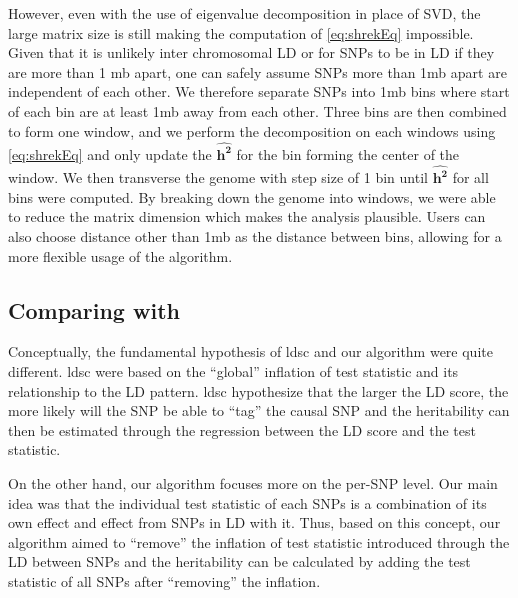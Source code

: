 			However, even with the use of eigenvalue decomposition in place of \gls{SVD}, the large matrix size is still making the computation of \cref{eq:shrekEq} impossible. 
			Given that it is unlikely inter chromosomal \gls{LD} or for \glspl{SNP} to be in \gls{LD} if they are more than 1 \gls{mb} apart, one can safely assume \glspl{SNP} more than 1\gls{mb} apart are independent of each other. 
			We therefore separate \glspl{SNP} into 1\gls{mb} bins where start of each bin are at least 1\gls{mb} away from each other. 
			Three bins are then combined to form one window, and we perform the decomposition on each windows using \cref{eq:shrekEq} and only update the $\boldsymbol{\hat{h^2}}$ for the bin forming the center of the window.
			We then transverse the genome with step size of 1 bin until $\boldsymbol{\hat{h^2}}$ for all bins were computed. 
			By breaking down the genome into windows, we were able to reduce the matrix dimension which makes the analysis plausible.
			Users can also choose distance other than 1\gls{mb} as the distance between bins, allowing for a more flexible usage of the algorithm.
			
		\subsection{Comparing with }
			Conceptually, the fundamental hypothesis of \gls{ldsc} and our algorithm were quite different.
			\gls{ldsc} were based on the ``global'' inflation of test statistic and its relationship to the \gls{LD} pattern.
			\gls{ldsc} hypothesize that the larger the \gls{LD} score, the more likely will the \gls{SNP} be able to ``tag'' the causal \gls{SNP} and the heritability can then be estimated through the regression between the \gls{LD} score and the test statistic.
			
			On the other hand, our algorithm focuses more on the per-\gls{SNP} level.
			Our main idea was that the individual test statistic of each \glspl{SNP} is a combination of its own effect and effect from \glspl{SNP} in \gls{LD} with it. 
			Thus, based on this concept, our algorithm aimed to ``remove'' the inflation of test statistic introduced through the \gls{LD} between \glspl{SNP} and the heritability can be calculated by adding the test statistic of all \glspl{SNP} after ``removing'' the inflation. 
			
